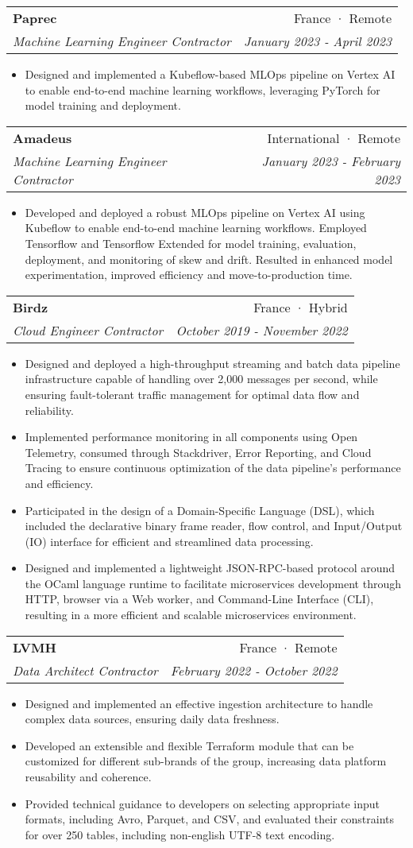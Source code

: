 \documentclass[letterpaper,11pt]{article}
\makeatletter
\newcommand{\resumeItem}[1]{
  \item\small{#1 \vspace{-2pt}}
}
\newcommand{\resumeSubheading}[4]{
  \vspace{-1pt}\item
    \begin{tabular*}{0.97\textwidth}[t]{l@{\extracolsep{\fill}}r}
      \textbf{#1} & #2 \\
      \textit{\small#3} & \textit{\small #4} \\
    \end{tabular*}\vspace{-5pt}
}
\newcommand{\resumeItemListStart}{\begin{itemize}}
\newcommand{\resumeItemListEnd}{\end{itemize}\vspace{-5pt}}
\makeatother
\begin{document}
\resumeSubheading{Paprec}
{France · Remote}
{Machine Learning Engineer Contractor}
{January 2023 - April 2023}
\resumeItemListStart{}
\resumeItem{
	Designed and implemented a Kubeflow-based MLOps pipeline on Vertex AI to enable
	end-to-end machine learning workflows, leveraging PyTorch for model training and
	deployment.
}
\resumeItemListEnd{}


\resumeSubheading{Amadeus}
{International · Remote}
{Machine Learning Engineer Contractor}
{January 2023 - February 2023}
\resumeItemListStart{}
\resumeItem{
	Developed and deployed a robust MLOps pipeline on Vertex AI using Kubeflow to
	enable end-to-end machine learning workflows. Employed Tensorflow and Tensorflow
	Extended for model training, evaluation, deployment, and monitoring of skew and
	drift. Resulted in enhanced model experimentation, improved efficiency and
	move-to-production time.
}
\resumeItemListEnd{}


\resumeSubheading{Birdz}
{France · Hybrid}
{Cloud Engineer Contractor}
{October 2019 - November 2022}
\resumeItemListStart{}
\resumeItem{
	Designed and deployed a high-throughput streaming and batch data pipeline
	infrastructure capable of handling over 2,000 messages per second, while ensuring
	fault-tolerant traffic management for optimal data flow and reliability.
}
\resumeItem{
	Implemented performance monitoring in all components using Open Telemetry,
	consumed through Stackdriver, Error Reporting, and Cloud Tracing to ensure
	continuous optimization of the data pipeline's performance and efficiency.
}
\resumeItem{
	Participated in the design of a Domain-Specific Language (DSL), which included the
	declarative binary frame reader, flow control, and Input/Output (IO) interface
	for efficient and streamlined data processing.
}
\resumeItem{
	Designed and implemented a lightweight JSON-RPC-based protocol around the
	OCaml language runtime to facilitate microservices development through HTTP,
	browser via a Web worker, and Command-Line Interface (CLI), resulting in a more
	efficient and scalable microservices environment.
}
\resumeItemListEnd{}


\resumeSubheading{LVMH}
{France · Remote}
{Data Architect Contractor}
{February 2022 - October 2022}
\resumeItemListStart{}
\resumeItem{
	Designed and implemented an effective ingestion architecture to handle complex
	data sources, ensuring daily data freshness.
}
\resumeItem{
	Developed an extensible and flexible Terraform module that can be customized for
	different sub-brands of the group, increasing data platform reusability and
	coherence.
}
\resumeItem{
	Provided technical guidance to developers on selecting appropriate input formats,
	including Avro, Parquet, and CSV, and evaluated their constraints for over 250
	tables, including non-english UTF-8 text encoding.
}
\resumeItemListEnd{}
\end{document}
